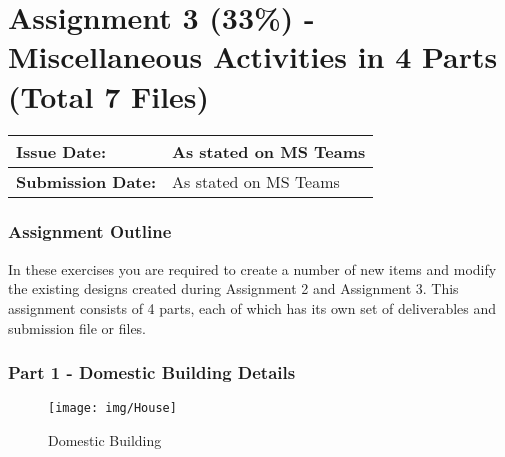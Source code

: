 
	

\part*{Assignment 3 (33\%) - Miscellaneous Activities in 4 Parts (Total 7 Files)}



\begin{tabularx}{\textwidth}{ |X|X| }
	\hline
	\textbf{Issue Date:} & As stated on MS Teams \\
	\hline 
	\textbf{Submission Date:}  & As stated on MS Teams  \\
	\hline
\end{tabularx}



\section*{Assignment Outline}



In these exercises you are required to create a number of new items and modify the existing designs created during Assignment 2 and Assignment 3.  This assignment consists of 4 parts, each of which has its own set of deliverables and submission file or files.

\newpage
\section*{Part 1 - Domestic Building Details}



\begin{figure}
	\centering
	\texttt{[image: img/House]}
	\caption{Domestic Building}
	\label{fig:house}
\end{figure}



